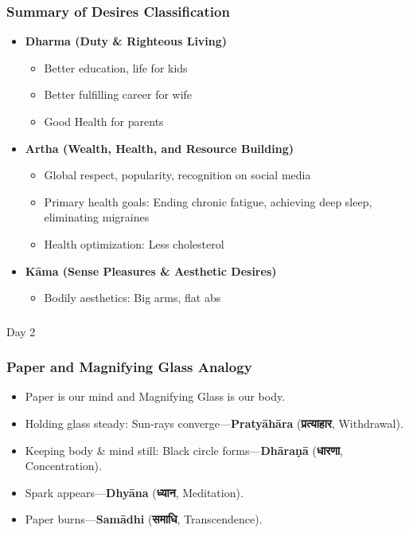 \begin{frame}[fragile]\frametitle{Summary of Desires Classification}
      \begin{itemize}
        \item \textbf{Dharma (Duty \& Righteous Living)}
        \begin{itemize}
          \item Better education, life for kids
          \item Better fulfilling career for wife
          \item Good Health for parents
        \end{itemize}
        \item \textbf{Artha (Wealth, Health, and Resource Building)}
        \begin{itemize}
          \item Global respect, popularity, recognition on social media
          \item Primary health goals: Ending chronic fatigue, achieving deep sleep, eliminating migraines
          \item Health optimization: Less cholesterol
        \end{itemize}
        \item \textbf{Kāma (Sense Pleasures \& Aesthetic Desires)}
        \begin{itemize}
          \item Bodily aesthetics: Big arms, flat abs
        \end{itemize}
      \end{itemize}
\end{frame}

\begin{frame}[fragile]\frametitle{}
\begin{center}
{\Large Day 2}
\end{center}
\end{frame}


\begin{frame}[fragile]\frametitle{Paper and Magnifying Glass Analogy}
      \begin{itemize}
      \item Paper is our mind and Magnifying Glass is our body.
      \item Holding glass steady: Sun-rays converge—\textbf{Pratyāhāra} (\textbf{प्रत्याहार}, Withdrawal).
      \item Keeping body \& mind still: Black circle forms—\textbf{Dhāraṇā} (\textbf{धारणा}, Concentration).
      \item Spark appears—\textbf{Dhyāna} (\textbf{ध्यान}, Meditation).
      \item Paper burns—\textbf{Samādhi} (\textbf{समाधि}, Transcendence).
      \end{itemize}
\end{frame}

